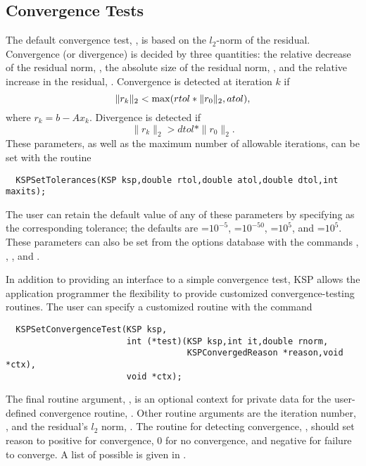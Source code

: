 \subsection{Convergence Tests}
\label{section:convergencetests}

The default convergence test, , is 
based on the $l_2$-norm of the residual. Convergence 
(or divergence) is decided by three quantities:
the relative decrease of the residual norm, , the absolute 
size of the residual norm, , and the relative increase in the 
residual, .  Convergence is detected at iteration $ k $ if
\[  \| r_k \|_2 < {\rm max} ( rtol * \| r_0 \|_2, atol), \]
where $r_k = b - A x_k$.  Divergence is detected if
\[  \| r_k \|_2 > dtol * \| r_0 \|_2. \]
These parameters, as well as the maximum number of allowable iterations, 
can be set with the routine 
\begin{verbatim}
  KSPSetTolerances(KSP ksp,double rtol,double atol,double dtol,int maxits);
\end{verbatim}
The user can retain the default value of any of these parameters by
specifying   as the 
corresponding tolerance; the
defaults are =$10^{-5}$, =$10^{-50}$,
=$10^{5}$, and =$10^5$.
These parameters can also be set from the options database with the 
commands  ,  ,  ,
  
and  . 

In addition to providing an interface to a simple convergence test,
KSP allows the application programmer the flexibility to provide 
customized convergence-testing routines.  
The user can specify a customized 
routine with the command 
\begin{verbatim}
  KSPSetConvergenceTest(KSP ksp,
                        int (*test)(KSP ksp,int it,double rnorm,
                                    KSPConvergedReason *reason,void *ctx),
                        void *ctx);
\end{verbatim}
The final routine argument, , is an optional context for private
data for the user-defined convergence routine, .  Other
 routine arguments are the iteration
number, , and the residual's $ l_2 $ norm, .
The routine for detecting convergence, , should set reason to 
positive for convergence, 0 for no convergence, and negative for 
failure to converge.  A list of possible  is given
 in .
 
